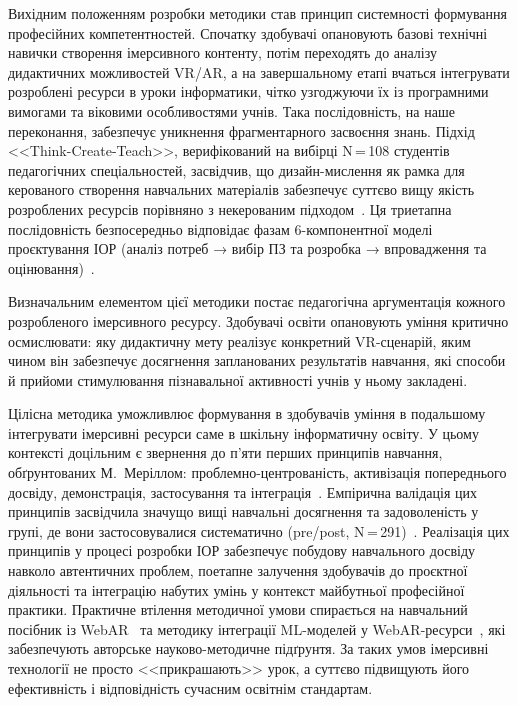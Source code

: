 Вихідним положенням розробки методики став принцип системності формування професійних компетентностей. Спочатку здобувачі опановують базові технічні навички створення імерсивного контенту, потім переходять до аналізу дидактичних можливостей VR/AR, а на завершальному етапі вчаться інтегрувати розроблені ресурси в уроки інформатики, чітко узгоджуючи їх із програмними вимогами та віковими особливостями учнів. Така послідовність, на наше переконання, забезпечує уникнення фрагментарного засвоєння знань. Підхід <<Think-Create-Teach>>, верифікований на вибірці N\,=\,108 студентів педагогічних спеціальностей, засвідчив, що дизайн-мислення як рамка для керованого створення навчальних матеріалів забезпечує суттєво вищу якість розроблених ресурсів порівняно з некерованим підходом~\cite{Calavia2023TCT}. Ця триетапна послідовність безпосередньо відповідає фазам 6-компонентної моделі проєктування ІОР (аналіз потреб → вибір ПЗ та розробка → впровадження та оцінювання)~\cite{Semerikov2022IERDesign}.

Визначальним елементом цієї методики постає педагогічна аргументація кожного розробленого імерсивного ресурсу. Здобувачі освіти опановують уміння критично осмислювати: яку дидактичну мету реалізує конкретний VR-сценарій, яким чином він забезпечує досягнення запланованих результатів навчання, які способи й прийоми стимулювання пізнавальної активності учнів у ньому закладені.

Цілісна методика уможливлює формування в здобувачів уміння в подальшому інтегрувати імерсивні ресурси саме в шкільну інформатичну освіту. У цьому контексті доцільним є звернення до п'яти перших принципів навчання, обґрунтованих М.~Меріллом: проблемно-центрованість, активізація попереднього досвіду, демонстрація, застосування та інтеграція~\cite{KGeneral2020}. Емпірична валідація цих принципів засвідчила значущо вищі навчальні досягнення та задоволеність у групі, де вони застосовувалися систематично (pre/post, N\,=\,291)~\cite{Badali2020MerrillMOOC}. Реалізація цих принципів у процесі розробки ІОР забезпечує побудову навчального досвіду навколо автентичних проблем, поетапне залучення здобувачів до проєктної діяльності та інтеграцію набутих умінь у контекст майбутньої професійної практики. Практичне втілення методичної умови спирається на навчальний посібник із WebAR~\cite{Shepiliev2020WebAR} та методику інтеграції ML-моделей у WebAR-ресурси~\cite{Semerikov2024WebARML_CoSinE}, які забезпечують авторське науково-методичне підґрунтя. За таких умов імерсивні технології не просто <<прикрашають>> урок, а суттєво підвищують його ефективність і відповідність сучасним освітнім стандартам.

